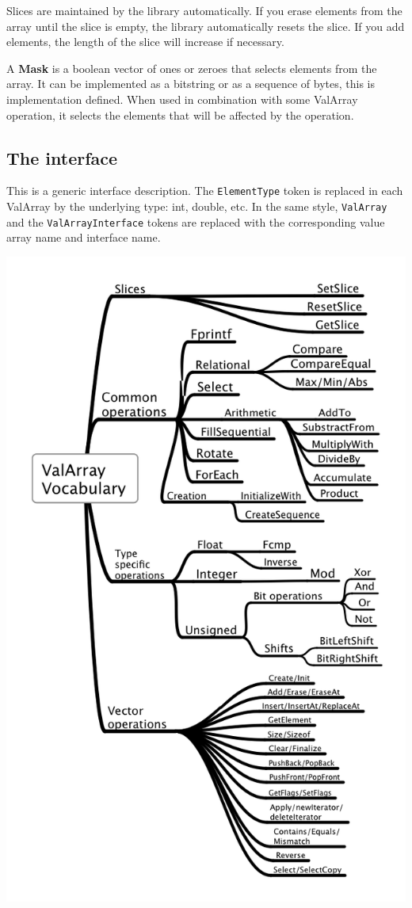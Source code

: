 \documentclass[12pt,a4paper]{memoir} %
\begin{document}
{{Slices are maintained by the library automatically. If you erase elements from the array until the slice is empty, the library automatically
resets the slice. If you add elements, the length of the slice will increase if necessary.

A \textbf{Mask} is a boolean vector of ones or zeroes that selects elements from the array. It can be implemented as a bitstring or as a sequence
of bytes, this is implementation defined. When used in combination with some ValArray operation, it selects the elements that will be affected
by the operation.
\subsection{The interface}
This is a generic interface description. The \texttt{ElementType} token is replaced in each ValArray by the underlying type: 
int, double, etc. In the same
style, \texttt{ValArray} and the \texttt{ValArrayInterface} tokens are replaced with the corresponding value array name and interface name.

\newpage
\includegraphics[scale=0.55]{ValArray.png}

}}
\end{document}
